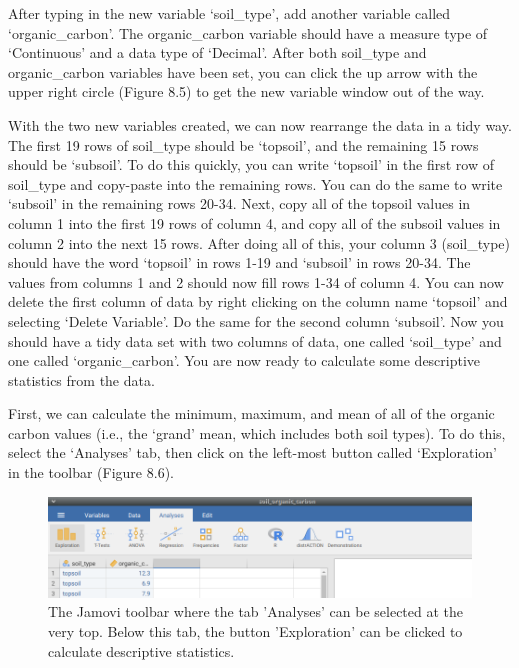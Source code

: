 \documentclass[
]{scrbook}
\begin{document}
After typing in the new variable `soil\_type', add another variable called `organic\_carbon'.
The organic\_carbon variable should have a measure type of `Continuous' and a data type of `Decimal'.
After both soil\_type and organic\_carbon variables have been set, you can click the up arrow with the upper right circle (Figure 8.5) to get the new variable window out of the way.

With the two new variables created, we can now rearrange the data in a tidy way.
The first 19 rows of soil\_type should be `topsoil', and the remaining 15 rows should be `subsoil'.
To do this quickly, you can write `topsoil' in the first row of soil\_type and copy-paste into the remaining rows.
You can do the same to write `subsoil' in the remaining rows 20-34.
Next, copy all of the topsoil values in column 1 into the first 19 rows of column 4, and copy all of the subsoil values in column 2 into the next 15 rows.
After doing all of this, your column 3 (soil\_type) should have the word `topsoil' in rows 1-19 and `subsoil' in rows 20-34.
The values from columns 1 and 2 should now fill rows 1-34 of column 4.
You can now delete the first column of data by right clicking on the column name `topsoil' and selecting `Delete Variable'.
Do the same for the second column `subsoil'.
Now you should have a tidy data set with two columns of data, one called `soil\_type' and one called `organic\_carbon'.
You are now ready to calculate some descriptive statistics from the data.

First, we can calculate the minimum, maximum, and mean of all of the organic carbon values (i.e., the `grand' mean, which includes both soil types).
To do this, select the `Analyses' tab, then click on the left-most button called `Exploration' in the toolbar (Figure 8.6).

\begin{figure}
\includegraphics[width=1\linewidth]{img/jamovi_exploration} \caption{The Jamovi toolbar where the tab 'Analyses' can be selected at the very top. Below this tab, the button 'Exploration' can be clicked to calculate descriptive statistics.}\label{fig:unnamed-chunk-29}
\end{figure}
\end{document}
